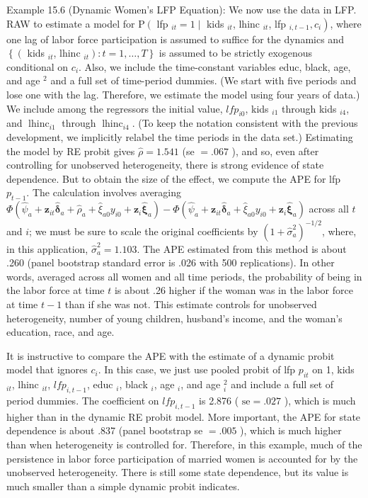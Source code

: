 \documentclass[10pt]{article}
\begin{document}
Example 15.6 (Dynamic Women's LFP Equation): We now use the data in LFP. RAW to estimate a model for $\mathrm{P}\left(\right.$ lfp $_{i t}=1 \mid$ kids $_{i t}$, lhinc $_{i t}$, lfp $\left._{i, t-1}, c_{i}\right)$, where one lag of labor force participation is assumed to suffice for the dynamics and $\left\{\left(\right.\right.$ kids $_{i t}$, lhinc $\left.\left._{i t}\right): t=1, \ldots, T\right\}$ is assumed to be strictly exogenous conditional on $c_{i}$. Also, we include the time-constant variables educ, black, age, and age ${ }^{2}$ and a full set of time-period dummies. (We start with five periods and lose one with the lag. Therefore, we estimate the model using four years of data.) We include among the regressors the initial value, $l f p_{i 0}$, kids $_{i 1}$ through kids $_{i 4}$, and $\operatorname{lhinc}_{i 1}$ through $\operatorname{lhinc}_{i 4}$. (To keep the notation consistent with the previous development, we implicitly relabel the time periods in the data set.) Estimating the model by RE probit gives $\hat{\rho}=1.541$ (se $=.067$ ), and so, even after controlling for unobserved heterogeneity, there is strong evidence of state dependence. But to obtain the size of the effect, we compute the APE for lfp $p_{t-1}$. The calculation involves averaging $\Phi\left(\hat{\psi}_{a}+\mathbf{z}_{i t} \hat{\boldsymbol{\delta}}_{a}+\hat{\rho}_{a}+\hat{\xi}_{a 0} y_{i 0}+\right. \left.\mathbf{z}_{i} \hat{\boldsymbol{\xi}}_{a}\right)-\Phi\left(\hat{\psi}_{a}+\mathbf{z}_{i t} \hat{\boldsymbol{\delta}}_{a}+\hat{\xi}_{a 0} y_{i 0}+\mathbf{z}_{i} \hat{\boldsymbol{\xi}}_{a}\right)$ across all $t$ and $i$; we must be sure to scale the original coefficients by $\left(1+\hat{\sigma}_{a}^{2}\right)^{-1 / 2}$, where, in this application, $\hat{\sigma}_{a}^{2}=1.103$. The APE estimated from this method is about .260 (panel bootstrap standard error is .026 with 500 replications). In other words, averaged across all women and all time periods, the probability of being in the labor force at time $t$ is about .26 higher if the woman was in the labor force at time $t-1$ than if she was not. This estimate controls for unobserved heterogeneity, number of young children, husband's income, and the woman's education, race, and age.

It is instructive to compare the APE with the estimate of a dynamic probit model that ignores $c_{i}$. In this case, we just use pooled probit of lfp $p_{i t}$ on 1, kids ${ }_{i t}$, lhinc ${ }_{i t}$, $l f p_{i, t-1}$, educ $_{i}$, black $_{i}$, age $_{i}$, and age $_{i}^{2}$ and include a full set of period dummies. The coefficient on $l f p_{i, t-1}$ is 2.876 ( $\mathrm{se}=.027$ ), which is much higher than in the dynamic RE probit model. More important, the APE for state dependence is about .837 (panel bootstrap se $=.005$ ), which is much higher than when heterogeneity is controlled for. Therefore, in this example, much of the persistence in labor force participation of married women is accounted for by the unobserved heterogeneity. There is still some state dependence, but its value is much smaller than a simple dynamic probit indicates.
\end{document}
